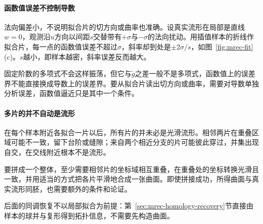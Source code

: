 \paragraph{函数值误差不控制导数}

法向偏差小，不说明拟合片的切方向或曲率也准确。设真实流形在局部是直线$w=0$，观测沿$u$方向以间距$s$交替带有$+\sigma$与$-\sigma$的法向扰动。用插值样本的折线作拟合片，每一点的函数值误差不超过$\sigma$，斜率却到处是$\pm2\sigma/s$，如图~\ref{fig:mrec-fit}(c)。$s$越小，即样本越密，斜率误差反而越大。

固定阶数的多项式不会这样振荡，但它与$\widetilde g$之差一般不是多项式，函数值上的误差界不能直接换成导数上的误差界。要从拟合片读出切方向或曲率，需要对导数单独分析误差，函数值逼近只是其中一个条件。

\paragraph{多片的并不自动是流形}

在每个样本附近各拟合一片以后，所有片的并未必是光滑流形。相邻两片在重叠区域可能不一致，留下台阶或缝隙；来自两个相近分支的片可能彼此穿过，并集出现自交，在交线附近根本不是流形。

要拼成一个整体，至少需要相邻片的坐标域相互重叠，在重叠处的坐标转换光滑且一致，并用适当的方式把各片平滑地合成一张曲面。即使拼接成功，所得曲面与真实流形同胚，也需要额外的条件和论证。

后面的同调恢复不以局部拟合为前提：第~\ref{sec:mrec-homology-recovery}节直接由样本的球并与复形得到拓扑信息，不需要先构造曲面。
